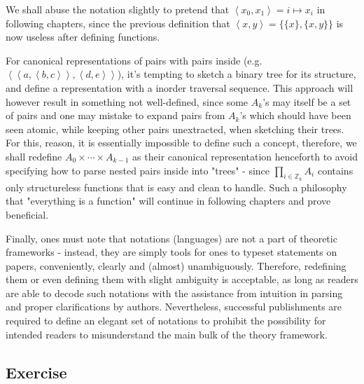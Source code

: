 \documentclass{book}
\theoremstyle{definition}\newtheorem{mechanism}{Mechanism}
\theoremstyle{remark}\newtheorem*{remark}{Remark}
\begin{document}
We shall abuse the notation slightly to pretend that $\left<x_0, x_1\right> = i\mapsto x_i$ in following chapters, since the previous definition that $\left<x, y\right> = \{\{x\}, \{x, y\}\}$ is now useless after defining functions. 

For canonical representations of pairs with pairs inside (e.g. $\left<\left<a, \left<b, c\right>\right>, \left<d, e\right>\right>$), it's tempting to sketch a binary tree for its structure, and define a representation with a inorder traversal sequence. This approach will however result in something not well-defined, since some $A_k$'s may itself be a set of pairs and one may mistake to expand pairs from $A_k$'s which should have been seen atomic, while keeping other pairs unextracted, when sketching their trees. For this, reason, it is essentially impossible to define such a concept, therefore, we shall redefine $A_0\times \cdots \times A_{k - 1}$ as their canonical representation henceforth to avoid specifying how to parse nested pairs inside into "trees" - since $\prod_{i\in \mathbb Z_k} A_i$ contains only structureless functions that is easy and clean to handle. Such a philosophy that "everything is a function" will continue in following chapters and prove beneficial.

Finally, ones must note that notations (languages) are not a part of theoretic frameworks - instead, they are simply tools for ones to typeset statements on papers, conveniently, clearly and (almost) unambiguously. Therefore, redefining them or even defining them with slight ambiguity is acceptable, as long as readers are able to decode such notations with the assistance from intuition in parsing and proper clarifications by authors. Nevertheless, successful publishments are required to define an elegant set of notations to prohibit the possibility for intended readers to misunderstand the main bulk of the theory framework.

\subsection*{Exercise}
\end{document}
